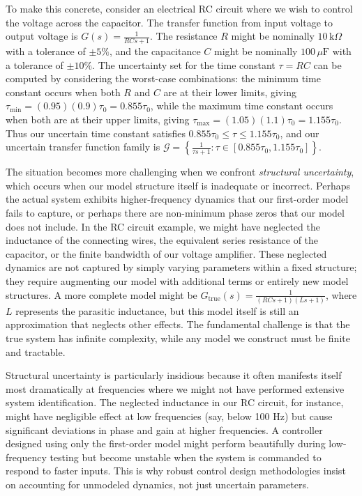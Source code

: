 To make this concrete, consider an electrical RC circuit where we wish to control the voltage across the capacitor. The transfer function from input voltage to output voltage is $G(s) = \frac{1}{RCs + 1}$. The resistance $R$ might be nominally $10\,\text{k}\Omega$ with a tolerance of $\pm 5\%$, and the capacitance $C$ might be nominally $100\,\mu\text{F}$ with a tolerance of $\pm 10\%$. The uncertainty set for the time constant $\tau = RC$ can be computed by considering the worst-case combinations: the minimum time constant occurs when both $R$ and $C$ are at their lower limits, giving $\tau_{\min} = (0.95)(0.9)\tau_0 = 0.855\tau_0$, while the maximum time constant occurs when both are at their upper limits, giving $\tau_{\max} = (1.05)(1.1)\tau_0 = 1.155\tau_0$. Thus our uncertain time constant satisfies $0.855\tau_0 \leq \tau \leq 1.155\tau_0$, and our uncertain transfer function family is $\mathcal{G} = \left\{ \frac{1}{\tau s + 1} : \tau \in [0.855\tau_0, 1.155\tau_0] \right\}$.

The situation becomes more challenging when we confront \emph{structural uncertainty}, which occurs when our model structure itself is inadequate or incorrect. Perhaps the actual system exhibits higher-frequency dynamics that our first-order model fails to capture, or perhaps there are non-minimum phase zeros that our model does not include. In the RC circuit example, we might have neglected the inductance of the connecting wires, the equivalent series resistance of the capacitor, or the finite bandwidth of our voltage amplifier. These neglected dynamics are not captured by simply varying parameters within a fixed structure; they require augmenting our model with additional terms or entirely new model structures. A more complete model might be $G_{\text{true}}(s) = \frac{1}{(RCs + 1)(Ls + 1)}$, where $L$ represents the parasitic inductance, but this model itself is still an approximation that neglects other effects. The fundamental challenge is that the true system has infinite complexity, while any model we construct must be finite and tractable.

Structural uncertainty is particularly insidious because it often manifests itself most dramatically at frequencies where we might not have performed extensive system identification. The neglected inductance in our RC circuit, for instance, might have negligible effect at low frequencies (say, below 100 Hz) but cause significant deviations in phase and gain at higher frequencies. A controller designed using only the first-order model might perform beautifully during low-frequency testing but become unstable when the system is commanded to respond to faster inputs. This is why robust control design methodologies insist on accounting for unmodeled dynamics, not just uncertain parameters.

